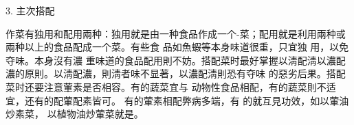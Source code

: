 3.      主次搭配

作菜有独用和配用兩种：独用就是由一种食品作成一个-菜；配用就是利用兩种或兩种以上的食品配成一个菜。有些食 品如魚蝦等本身味道很重，只宜独
用，以免夺味。本身沒有濃 重味道的食品配用則不妨。搭配菜时最好掌握以淸配淸以濃配 濃的原則。以淸配濃，則淸者味不显著，以濃配淸則恐有夺味 的惡劣后果。搭配菜时还要注意葷素是否相容。有的蔬菜宜与 动物性食品相配，有的蔬菜則不适宜，还有的配葷配素皆可。 有的葷素相配弊病多端，有
的就互見功效，如以葷油炒素菜， 以植物油炒葷菜就是。
